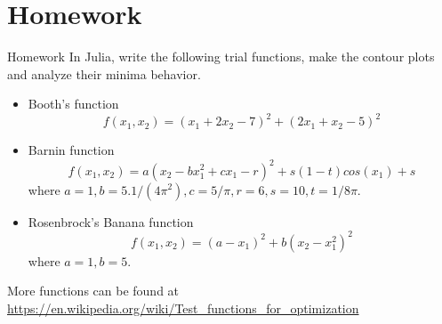 \documentclass{beamer}
\begin{document}
\section{Homework}
\begin{frame}{Homework}
In Julia, write the following trial functions, make the contour plots and analyze their minima behavior.
\begin{itemize}
    \item Booth's function
    \begin{equation*}
        f(x_1, x_2) = (x_1 + 2x_2 -7)^2 + (2x_1 + x_2 -5)^2
    \end{equation*}

    \item Barnin function
    \begin{equation*}
        f(x_1, x_2) = a(x_2 - bx_1^2 + cx_1 - r)^2 + s(1-t)cos(x_1) +s
    \end{equation*}
    where $a=1, b=5.1/(4\pi^2), c=5/\pi, r=6, s=10, t=1/8\pi$.
    
    \item Rosenbrock's Banana function
    \begin{equation*}
        f(x_1, x_2) = (a-x_1)^2 + b(x_2-x_1^2)^2
    \end{equation*}
    where $a=1, b=5$.
    
\end{itemize}
More functions can be found at \url{https://en.wikipedia.org/wiki/Test_functions_for_optimization}
\end{frame}
\end{document}
